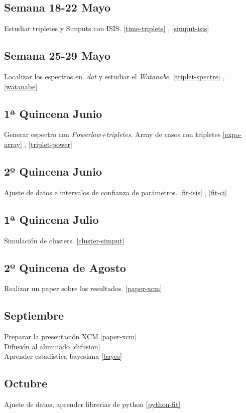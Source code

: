 \documentclass[letterpaper,12pt]{article}
\begin{document}
\subsection*{Semana 18-22 Mayo}
Estudiar tripletes y Simputs con ISIS. \ref{time-triplets} , \ref{simput-isis}
\subsection*{Semana 25-29 Mayo}
Localizar los espectros en \textit{.dat} y estudiar el \textit{Watanabe}. \ref{triplet-spectre} , \ref{watanabe}
\subsection*{1ª Quincena Junio}
Generar espectro con \textit{Powerlaw+tripletes}. Array de casos con tripletes \ref{expo-array} , \ref{triplet-power}
\subsection*{2º Quincena Junio}
Ajuste de datos e intervalos de confianza de par\'ametros. \ref{fit-isis} , \ref{fit-ci}
\subsection*{1ª Quincena Julio}
Simulaci\'on de clusters. \ref{cluster-simput}
\subsection*{2º Quincena de Agosto}
Realizar un paper sobre los resultados. \ref{paper-xcm}
\subsection*{Septiembre}
Preparar la presentaci\'on XCM.\ref{paper-xcm}
\\Difusi\'on al alumnado \ref{difusion}
\\Aprender estad\'istica bayesiana \ref{bayes}
\subsection*{Octubre}
Ajuste de datos, aprender librerias de python \ref{python-fit}
%
\end{document}
